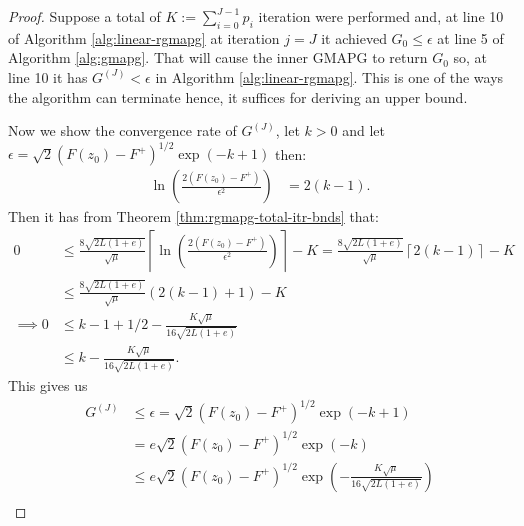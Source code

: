 \documentclass[12pt]{report}
\begin{document}
        \begin{proof}
            Suppose a total of $K := \sum_{i = 0}^{J - 1} p_i$ iteration were performed and, at line 10 of Algorithm \ref{alg:linear-rgmapg} at iteration $j = J$ it achieved $G_0 \le \epsilon$ at line 5 of Algorithm \ref{alg:gmapg}. 
            That will cause the inner GMAPG to return $G_0$ so, at line 10 it has $G^{(J)} < \epsilon$ in Algorithm \ref{alg:linear-rgmapg}. 
            This is one of the ways the algorithm can terminate hence, it suffices for deriving an upper bound. 
            \par
            Now we show the convergence rate of $G^{(J)}$, let $k > 0$ and let $\epsilon = \sqrt{2}(F(z_0) - F^+)^{1/2}\exp(-k + 1)$ then: 
            \begin{align*}
                \ln \left(
                    \frac{2(F(z_0) - F^+)}{\epsilon^2}
                \right)
                &= 2(k - 1). 
            \end{align*}
            Then it has from Theorem \ref{thm:rgmapg-total-itr-bnds} that:
            \begin{align*}
                0 &\le 
                \frac{8\sqrt{2L(1 + e)}}{\sqrt{\mu}}\left\lceil 
                    \ln\left(
                        \frac{2(F(z_0) - F^+)}{\epsilon^2}
                    \right)
                \right\rceil - K
                =
                \frac{8\sqrt{2L(1 + e)}}{\sqrt{\mu}}\left\lceil 
                    2(k - 1)
                \right\rceil - K 
                \\
                &\le 
                \frac{8\sqrt{2L(1 + e)}}{\sqrt{\mu}} (2(k - 1) + 1) - K
                \\
                \implies
                0 &\le k - 1 + 1/2 - \frac{K\sqrt{\mu}}{16\sqrt{2L(1 + e)}}
                \\
                &\le k - \frac{K\sqrt{\mu}}{16\sqrt{2L(1 + e)}} .
            \end{align*}
            This gives us 
            \begin{align*}
                G^{(J)} &\le \epsilon = \sqrt{2}(F(z_0) - F^+)^{1/2}\exp(-k + 1)
                \\
                &=
                e\sqrt{2}(F(z_0) - F^+)^{1/2}\exp(-k)
                \\
                &\le
                e\sqrt{2}(F(z_0) - F^+)^{1/2}\exp\left(
                    - \frac{K\sqrt{\mu}}{16\sqrt{2L(1 + e)}}
                \right)
                \\

\end{align*}
\end{proof}
\end{document}
